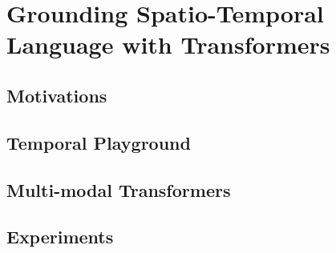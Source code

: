 \chapter{Grounding Spatio-Temporal Language with Transformers}

\section{Motivations}
\section{Temporal Playground}
\section{Multi-modal Transformers}
\section{Experiments}
